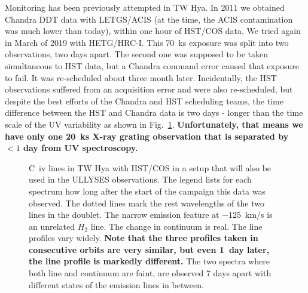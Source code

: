 \documentclass[letterpaper,11pt,twocolumn]{article}
\begin{document}
Monitoring has been previously attempted in TW Hya. In 2011 we obtained Chandra DDT
data with LETGS/ACIS (at the time, the ACIS contamination was much lower than
today), within one hour of HST/COS data.
We tried again in March of 2019 with HETG/HRC-I. This 70~ks exposure was split into two
observations, two days apart. The second one was supposed to be taken simultaneous to HST data,
but a Chandra command error caused that exposure to fail. It was
re-scheduled about three month later. Incidentally, the HST observations
suffered from an acquisition error and were also re-scheduled, but despite the
best efforts of the Chandra and HST scheduling teams, the time difference
between the HST and Chandra data is two days - longer than the time scale of the
UV variability as shown in Fig.~\ref{fig:UV2}. \textbf{Unfortunately, that
  means we have only one 20~ks X-ray grating observation that is separated by
  $<1$ day from UV spectroscopy.}

\begin{figure}
\begin{center}
\end{center}
\caption{\label{fig:UV2} C~{\sc iv} lines in TW Hya with HST/COS in a setup that will also be used in the ULLYSES observations. The legend lists for each spectrum how long after the
  start of the campaign this data was observed. The dotted lines mark the rest wavelengths of the two
  lines in the  doublet. The narrow emission feature at $-125$~km/s is
  an unrelated $H_2$ line. The change in continuum is real. The line profiles vary widely. \textbf{Note that the three
profiles taken in consecutive orbits are very similar, but even 1~day later,
the line profile is markedly different.} The two spectra where both line and
continuum are faint, are observed 7 days apart with different states of the
emission lines in between.}
\end{figure}
\end{document}
